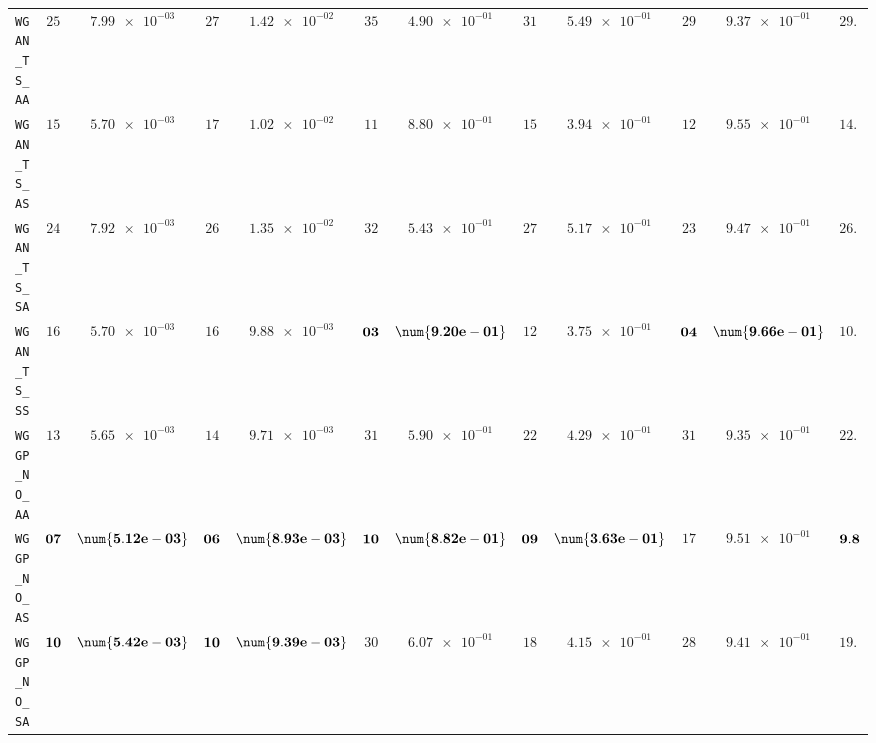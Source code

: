\begin{xltabular}{\textwidth}{l||cC|cC|cC|cC|cC||c}
	\texttt{WGAN\_TS\_AA} & $ 25$ & $ \num{7.99e-03}$ & $ 27$ & $ \num{1.42e-02}$ & $ 35$ & $ \num{4.90e-01}$ & $ 31$ & $ \num{5.49e-01}$ & $ 29$ & $ \num{9.37e-01}$ & $ 29.4$  \\
	\texttt{WGAN\_TS\_AS} & $ 15$ & $ \num{5.70e-03}$ & $ 17$ & $ \num{1.02e-02}$ & $ 11$ & $ \num{8.80e-01}$ & $ 15$ & $ \num{3.94e-01}$ & $ 12$ & $ \num{9.55e-01}$ & $ 14.0$  \\
	\texttt{WGAN\_TS\_SA} & $ 24$ & $ \num{7.92e-03}$ & $ 26$ & $ \num{1.35e-02}$ & $ 32$ & $ \num{5.43e-01}$ & $ 27$ & $ \num{5.17e-01}$ & $ 23$ & $ \num{9.47e-01}$ & $ 26.4$  \\
	\texttt{WGAN\_TS\_SS} & $ 16$ & $ \num{5.70e-03}$ & $ 16$ & $ \num{9.88e-03}$ & $\bf 03$ & $\bf \num{9.20e-01}$ & $ 12$ & $ \num{3.75e-01}$ & $\bf 04$ & $\bf \num{9.66e-01}$ & $ 10.2$  \\ \hline
	\texttt{WGGP\_NO\_AA} & $ 13$ & $ \num{5.65e-03}$ & $ 14$ & $ \num{9.71e-03}$ & $ 31$ & $ \num{5.90e-01}$ & $ 22$ & $ \num{4.29e-01}$ & $ 31$ & $ \num{9.35e-01}$ & $ 22.2$  \\
	\texttt{WGGP\_NO\_AS} & $\bf 07$ & $\bf \num{5.12e-03}$ & $\bf 06$ & $\bf \num{8.93e-03}$ & $\bf 10$ & $\bf \num{8.82e-01}$ & $\bf 09$ & $\bf \num{3.63e-01}$ & $ 17$ & $ \num{9.51e-01}$ & $\bf 9.8$  \\
	\texttt{WGGP\_NO\_SA} & $\bf 10$ & $\bf \num{5.42e-03}$ & $\bf 10$ & $\bf \num{9.39e-03}$ & $ 30$ & $ \num{6.07e-01}$ & $ 18$ & $ \num{4.15e-01}$ & $ 28$ & $ \num{9.41e-01}$ & $ 19.2$  \\

\end{xltabular}
